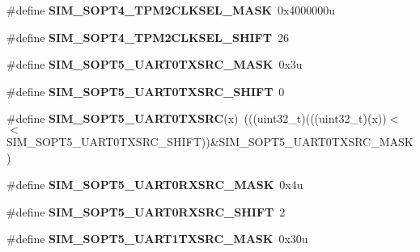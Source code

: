 \begin{DoxyCompactItemize}
\#define {\bfseries S\+I\+M\+\_\+\+S\+O\+P\+T4\+\_\+\+T\+P\+M2\+C\+L\+K\+S\+E\+L\+\_\+\+M\+A\+SK}~0x4000000u
\item 
\mbox{\label{group___s_i_m___register___masks_ga7e0e458665aad403b0a67a515fa08ff3}} 
\#define {\bfseries S\+I\+M\+\_\+\+S\+O\+P\+T4\+\_\+\+T\+P\+M2\+C\+L\+K\+S\+E\+L\+\_\+\+S\+H\+I\+FT}~26
\item 
\mbox{\label{group___s_i_m___register___masks_ga11646c1292cb7aab3128e1e563847e32}} 
\#define {\bfseries S\+I\+M\+\_\+\+S\+O\+P\+T5\+\_\+\+U\+A\+R\+T0\+T\+X\+S\+R\+C\+\_\+\+M\+A\+SK}~0x3u
\item 
\mbox{\label{group___s_i_m___register___masks_ga0220b88df4a0747579d24b77f4db4e67}} 
\#define {\bfseries S\+I\+M\+\_\+\+S\+O\+P\+T5\+\_\+\+U\+A\+R\+T0\+T\+X\+S\+R\+C\+\_\+\+S\+H\+I\+FT}~0
\item 
\mbox{\label{group___s_i_m___register___masks_ga65e932e39703b2b18dea82ca440fc68f}} 
\#define {\bfseries S\+I\+M\+\_\+\+S\+O\+P\+T5\+\_\+\+U\+A\+R\+T0\+T\+X\+S\+RC}(x)~(((uint32\+\_\+t)(((uint32\+\_\+t)(x))$<$$<$S\+I\+M\+\_\+\+S\+O\+P\+T5\+\_\+\+U\+A\+R\+T0\+T\+X\+S\+R\+C\+\_\+\+S\+H\+I\+FT))\&S\+I\+M\+\_\+\+S\+O\+P\+T5\+\_\+\+U\+A\+R\+T0\+T\+X\+S\+R\+C\+\_\+\+M\+A\+SK)
\item 
\mbox{\label{group___s_i_m___register___masks_ga6160de3cd4b7169ac9095c0d0eee46f7}} 
\#define {\bfseries S\+I\+M\+\_\+\+S\+O\+P\+T5\+\_\+\+U\+A\+R\+T0\+R\+X\+S\+R\+C\+\_\+\+M\+A\+SK}~0x4u
\item 
\mbox{\label{group___s_i_m___register___masks_ga27e87f2f792b880bd156907ab20e9910}} 
\#define {\bfseries S\+I\+M\+\_\+\+S\+O\+P\+T5\+\_\+\+U\+A\+R\+T0\+R\+X\+S\+R\+C\+\_\+\+S\+H\+I\+FT}~2
\item 
\mbox{\label{group___s_i_m___register___masks_gac473b632c382f785d524c177ff186e0d}} 
\#define {\bfseries S\+I\+M\+\_\+\+S\+O\+P\+T5\+\_\+\+U\+A\+R\+T1\+T\+X\+S\+R\+C\+\_\+\+M\+A\+SK}~0x30u
\item 
\mbox{\label{group___s_i_m___register___masks_ga7714c11e5536dacc90fbc2960e532e94}} 
$$
\end{DoxyCompactItemize}
